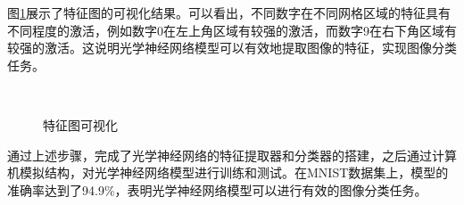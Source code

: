 图\ref{fig:visualize}展示了特征图的可视化结果。可以看出，不同数字在不同网格区域的特征具有不同程度的激活，例如数字0在左上角区域有较强的激活，而数字9在右下角区域有较强的激活。这说明光学神经网络模型可以有效地提取图像的特征，实现图像分类任务。

\begin{figure}[H]
    \centering
    \\
    \caption{特征图可视化}
    \label{fig:visualize}
\end{figure}

通过上述步骤，完成了光学神经网络的特征提取器和分类器的搭建，之后通过计算机模拟结构，对光学神经网络模型进行训练和测试。在MNIST数据集上，模型的准确率达到了94.9\%，表明光学神经网络模型可以进行有效的图像分类任务。
